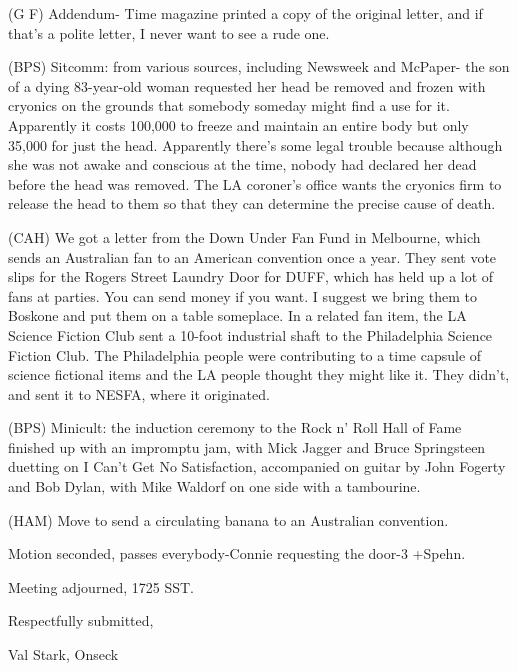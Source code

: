 \documentclass[12pt]{article}
\begin{document}
(G F) Addendum- Time magazine printed a copy of the original letter, and if that's a polite letter, I never want to see a rude one.

(BPS) Sitcomm: from various sources, including Newsweek and McPaper- the son of a dying 83-year-old woman requested her head be removed and frozen with cryonics on the grounds that somebody someday might find a use for it. Apparently it costs 100,000 to freeze and maintain an entire body but only 35,000 for just the head. Apparently there's some legal trouble because although she was not awake and conscious at the time, nobody had declared her dead before the head was removed. The LA coroner's office wants the cryonics firm to release the head to them so that they can determine the precise cause of death.

(CAH) We got a letter from the Down Under Fan Fund in Melbourne, which sends an Australian fan to an American convention once a year. They sent vote slips for the Rogers Street Laundry Door for DUFF, which has held up a lot of fans at parties. You can send money if you want. I suggest we bring them to Boskone and put them on a table someplace. In a related fan item, the LA Science Fiction Club sent a 10-foot industrial shaft to the Philadelphia Science Fiction Club. The Philadelphia people were contributing to a time capsule of science fictional items and the LA people thought they might like it. They didn't, and sent it to NESFA, where it originated.

(BPS) Minicult: the induction ceremony to the Rock n' Roll Hall of Fame finished up with an impromptu jam, with Mick Jagger and Bruce Springsteen duetting on I Can't Get No Satisfaction, accompanied on guitar by John Fogerty and Bob Dylan, with Mike Waldorf on one side with a tambourine.

(HAM) Move to send a circulating banana to an Australian convention.

Motion seconded, passes everybody-Connie requesting the door-3 +Spehn.

\vspace{12pt}

\noindent
Meeting adjourned, 1725 SST.

\vspace{18pt}

\centerline{Respectfully submitted,}
\centerline{Val Stark, Onseck}
\end{document}
